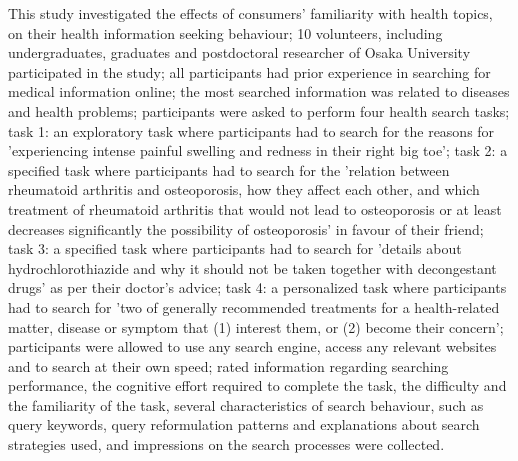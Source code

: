 \documentclass[]{article}
\begin{document}
This study investigated the effects of consumers' familiarity with health topics, on their health information seeking behaviour; 10 volunteers, including undergraduates, graduates and postdoctoral researcher of Osaka University participated in the study; all participants had prior experience in searching for medical information online; the most searched information was related to diseases and health problems; participants were asked to perform four health search tasks; task 1: an exploratory task where participants had to search for the reasons for 'experiencing intense painful swelling and redness in their right big toe'; task 2: a specified task where participants had to search for the 'relation between rheumatoid arthritis and osteoporosis, how they affect each other, and which treatment of rheumatoid arthritis that would not lead to osteoporosis or at least decreases significantly the possibility of osteoporosis' in favour of their friend; task 3: a specified task where participants had to search for 'details about  hydrochlorothiazide and why it should not be taken together with decongestant drugs' as per their doctor's advice; task 4: a personalized task where participants had to search for 'two of generally recommended treatments for a health-related matter, disease or symptom that (1) interest them, or (2) become their concern'; participants were allowed to use any search engine, access any relevant websites and to search at their own speed; rated information regarding searching performance, the cognitive effort required to complete the task, the difficulty and the familiarity of the task, several characteristics of search behaviour, such as query keywords, query reformulation patterns and explanations about search strategies used, and impressions on the search processes were collected. 
\end{document}
